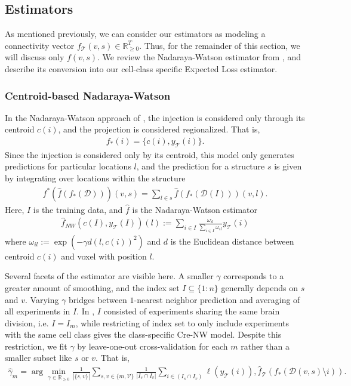 \newpage
\subsection{Estimators}
\label{supp_sec:estimators}
As mentioned previously, we can consider our estimators as modeling a connectivity vector $f_{\mathcal T} (v,s)  \in \mathbb R_{\geq 0}^T$.
Thus, for the remainder of this section, we will discuss only $f (v,s)$.
We review the Nadaraya-Watson estimator from  \citet{Knox2019-ot}, and describe its conversion into our cell-class specific Expected Loss estimator.

\subsubsection{Centroid-based Nadaraya-Watson}

In the Nadaraya-Watson approach of \citet{Knox2019-ot}, the injection is considered only through its centroid $c(i)$, and the projection is considered regionalized.
That is,
\begin{eqnarray*}
f_*(i) = \{c(i), y_{\mathcal T}(i)\}.
\end{eqnarray*}
Since the injection is considered only by its centroid, this model only generates predictions for particular locations $l$, and the prediction for a structure $s$ is given by integrating over locations within the structure
\begin{eqnarray*}
\label{eq:regionalize}
f^* (\hat f (f_*(\mathcal D))) (v,s) = \sum_{l \in s} \hat f (f_*(\mathcal D(I))) (v,l ).
\end{eqnarray*}
Here, $I$ is the training data, and $\hat f$ is the Nadaraya-Watson estimator
\begin{eqnarray*}
\hat f_{NW}( c(I) , y_{\mathcal T}(I) ) (l) :=  \sum_{i \in I} \frac{ \omega_{i l}}{\sum_{i \in I} \omega_{i l}} y_{\mathcal T}(i)
\end{eqnarray*}
where $\omega_{i l } := \exp( - \gamma d( l , c(i))^2 )$ and $d$ is the Euclidean distance between centroid $c(i)$ and voxel with position $l$.

Several facets of the estimator are visible here. 
A smaller $\gamma$ corresponds to a greater amount of smoothing, and the index set $I \subseteq  \{1:n\}$ generally depends on $s$ and $v$.
Varying $\gamma$   bridges between $1$-nearest neighbor prediction and averaging of all experiments in $I$.
In \citet{Knox2019-ot}, $I$ consisted of experiments sharing the same brain division, i.e. $I = I_m$, while restricting of index set to only include experiments with the same cell class gives the class-specific Cre-NW model.
Despite this restriction, we fit $\gamma$ by leave-one-out cross-validation for each $m$ rather than a smaller subset like $s$ or $v$.
That is,
\begin{eqnarray}
\label{eq:gamma_sel}
\widehat \gamma_m =  \arg \min_{\gamma \in \mathbb R_{\geq 0}} \frac{1}{|\{s,v\}|} \sum_{s,v \in \{m,\mathcal V\}} \frac{1}{ |I_{s} \cap I_v |} \sum_{i \in (I_{s} \cap I_v ) } \ell (y_{\mathcal T}(i)), \hat f_{\mathcal T} (f_*(\mathcal D(v,s) \setminus i)) .
\end{eqnarray}

